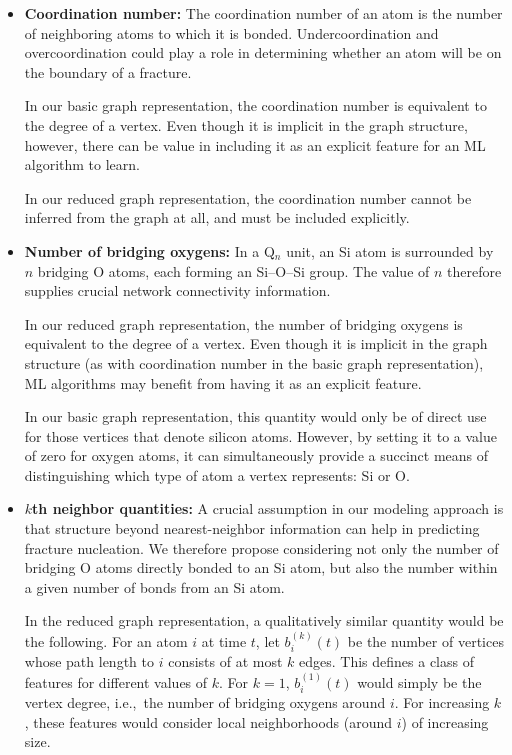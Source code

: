 \begin{itemize}
    \item \textbf{Coordination number:} The coordination number of an atom is the number of neighboring atoms to which it is bonded. Undercoordination and overcoordination could play a role in determining whether an atom will be on the boundary of a fracture.
    
    In our basic graph representation, the coordination number is equivalent to the degree of a vertex.  Even though it is implicit in the graph structure, however, there can be value in including it as an explicit feature for an ML algorithm to learn.
    
    In our reduced graph representation, the coordination number cannot be inferred from the graph at all, and must be included explicitly.

    \item\textbf{Number of bridging oxygens:} In a Q$_n$ unit, an Si atom is surrounded by $n$ bridging O atoms, each forming an Si--O--Si group.  The value of $n$ therefore supplies crucial network connectivity information. 
    
    In our reduced graph representation, the number of bridging oxygens is equivalent to the degree of a vertex.  Even though it is implicit in the graph structure (as with coordination number in the basic graph representation), ML algorithms may benefit from having it as an explicit feature.
    
    In our basic graph representation, this quantity would only be of direct use for those vertices that denote silicon atoms.  However, by setting it to a value of zero for oxygen atoms, it can simultaneously provide a succinct means of distinguishing which type of atom a vertex represents: Si or O.

    \item\textbf{$k$th neighbor quantities:} A crucial assumption in our modeling approach is that structure beyond nearest-neighbor information can help in predicting fracture nucleation.  We therefore propose considering not only the number of bridging O atoms directly bonded to an Si atom, but also the number within a given number of bonds from an Si atom.
    
    In the reduced graph representation, a qualitatively similar quantity would be the following.  For an atom $i$ at time $t$, let $b^{(k)}_i(t)$ be the number of vertices whose path length to $i$ consists of at most $k$ edges. This defines a class of features for different values of $k$.  For $k=1$, $b^{(1)}_i(t)$ would simply be the vertex degree, i.e.,\ the number of bridging oxygens around $i$.  For increasing $k$, these features would consider local neighborhoods (around $i$) of increasing size.


\end{itemize}
